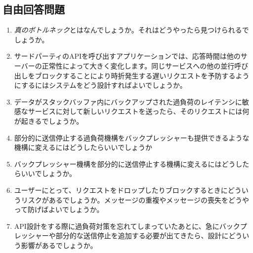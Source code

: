 \subsection*{自由回答問題}

\begin{enumerate}
  \item \emph{真のボトルネック}とはなんでしょうか。それはどうやったら見つけられるでしょうか。
  \item サードパーティのAPIを呼び出すアプリケーションでは、応答時間は他のサーバーの正常性によって大きく変化します。同じサービスへの他の並行呼び出しをブロックすることにより時折発生する遅いリクエストを予防するようにするにはシステムをどう設計すればよいでしょうか。
  \item データがスタックバッファ内にバックアップされた過負荷のレイテンシに敏感なサービスに対して新しいリクエストを送ったら、そのリクエストには何が起きるでしょうか。
  \item 部分的に送信停止する過負荷機構をバックプレッシャーも提供できるような機構に変えるにはどうしたらいいでしょうか
  \item バックプレッシャー機構を部分的に送信停止する機構に変えるにはどうしたらいいでしょうか。
  \item ユーザーにとって、リクエストをドロップしたりブロックするときにどういうリスクがあるでしょうか。メッセージの重複やメッセージの喪失をどうやって防げばよいでしょうか。
  \item API設計をする際に過負荷対策を忘れてしまっていたあとに、急にバックプレッシャーや部分的な送信停止を追加する必要が出てきたら、設計にどういう影響があるでしょうか。
\end{enumerate}
